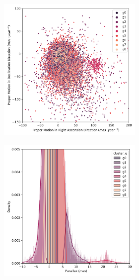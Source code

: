 \documentclass[11pt, a4paper, english]{book}
\begin{document}
\begin{figure}[H]
\begin{subfigure}{0.9\textwidth}
\begin{subfigure}[t]{0.30\textwidth}
    \end{subfigure}
  \end{subfigure}
  \caption{Melotte 25 Clusterix+TOPCAT characterization.}
  \label{fig:result_melotte_25_clusterix}
  \centering
  \begin{subfigure}{0.9\textwidth}
    \centering
    \begin{subfigure}[t]{0.30\textwidth}
      \centering
      \includegraphics[width=\textwidth]{../figures/melotte_25/kmeans_pm_melotte_25.png}
    \end{subfigure}
    \hfill
    \begin{subfigure}[t]{0.30\textwidth}
      \centering
      \includegraphics[width=\textwidth]{../figures/melotte_25/kmeans_parallax_melotte_25.png}

\end{subfigure}
\end{subfigure}
\end{figure}
\end{document}
